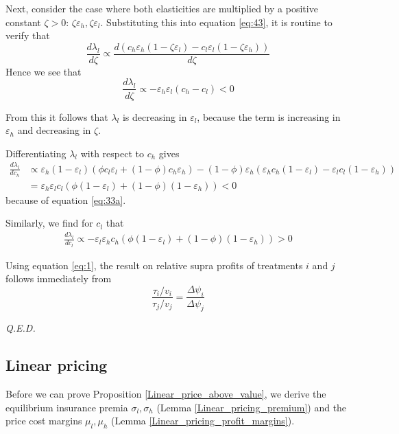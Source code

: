 \documentclass[a4paper,12pt]{article}
\newcommand{\qed}{\hspace*{\fill} {\em Q.E.D.}}
\begin{document}
Next, consider the case where both elasticities are multiplied by a positive constant \(\zeta>0\): \(\zeta \varepsilon_{h} ,\zeta \varepsilon_{l}\). Substituting this into equation \eqref{eq:43}, it is routine to verify that
\begin{equation}
\label{eq:32}
\frac{d \lambda_l}{d \zeta} \propto \frac{d(c_h \varepsilon_h (1- \zeta \varepsilon_l )-c_l \varepsilon_l(1-\zeta \varepsilon_h))}{d \zeta}
\end{equation}
Hence we see that
\begin{equation}
\label{eq:35}
\frac{d \lambda_l}{d \zeta} \propto - \varepsilon_h \varepsilon_l (c_h-c_l) < 0
\end{equation}

From this it follows that \(\lambda_l\) is decreasing in \(\varepsilon_l\), because the term is increasing in \(\varepsilon_h\) and decreasing in \(\zeta\).

Differentiating \(\lambda_l\) with respect to \(c_h\) gives
\begin{align*}
\frac{d \lambda_l}{d c_h} &\propto \varepsilon_h (1-\varepsilon_l)(\phi c_l\varepsilon_l+(1-\phi)c_h \varepsilon_h) - (1-\phi) \varepsilon_h (\varepsilon_h c_h (1-\varepsilon_l) - \varepsilon_l c_l (1-\varepsilon_h)) \\
 &= \varepsilon_h \varepsilon_l c_l (\phi(1-\varepsilon_l)+(1-\phi)(1-\varepsilon_h)) <0
\end{align*}
because of equation \eqref{eq:33a}.

Similarly, we find for \(c_l\) that
\begin{align*}
\frac{d \lambda_l}{d c_l} \propto -\varepsilon_l \varepsilon_h c_h (\phi (1-\varepsilon_l) + (1-\phi) (1-\varepsilon_h)) >0
\end{align*}

Using equation \eqref{eq:1}, the result on relative supra profits of treatments \(i\) and \(j\) follows immediately from
\begin{equation}
\frac{\tau_i/v_i}{\tau_j/v_j} = \frac{\Delta \psi_i}{\Delta \psi_j}
\end{equation}

 \qed

\subsection{Linear pricing}
\label{sec:org1cfe078}

Before we can prove Proposition \ref{Linear_price_above_value}, we derive the equilibrium insurance premia \(\sigma_l,\sigma_h\) (Lemma \ref{Linear_pricing_premium}) and the price cost margins \(\mu_l,\mu_h\) (Lemma \ref{Linear_pricing_profit_margins}).
\end{document}
